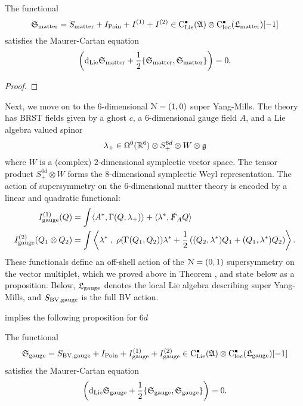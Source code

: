 \documentclass[10pt, oneside]{article}
\begin{document}
\begin{prop}
The functional
\[
\mathfrak S_{\rm matter} = S_{\rm matter} + I_{\rm Poin} + I^{(1)} + I^{(2)} \in {\rm C}_{\rm Lie}^\bullet(\mathfrak{A}) \otimes {\rm C}_{\rm loc}^\bullet(\mathfrak L_{\rm matter}) [-1]
\]
satisfies the Maurer-Cartan equation
\[
\left({\rm d}_{\rm Lie} \mathfrak S_{\rm matter} + \frac{1}{2} \{\mathfrak S_{\rm matter}, \mathfrak S_{\rm matter}\} \right) = 0 .
\]
\end{prop}
\begin{proof}
\end{proof}

Next, we move on to the $6$-dimensional $\mathcal N=(1,0)$ super Yang-Mills. 
The theory has BRST fields given by a ghost $c$, a $6$-dimensional gauge field $A$, and a Lie algebra valued spinor
\[
\lambda_+ \in \Omega^0(\mathbb R^6) \otimes S_+^{6d} \otimes W \otimes \mathfrak g 
\]
where $W$ is a (complex) $2$-dimensional symplectic vector space. 
The tensor product $S_+^{6d} \otimes W$ forms the $8$-dimensional symplectic Weyl representation. 
The action of supersymmetry on the $6$-dimensional matter theory is encoded by a linear and quadratic functional:
\begin{align*}
I_{\rm gauge}^{(1)}(Q) & = \int \langle A^*, \Gamma(Q, \lambda_+)\rangle + \langle\lambda^*, \slashed{F}_A Q\rangle \\
I_{\rm gauge}^{(2)}(Q_1 \otimes Q_2) & = \int \left\langle\lambda^* \;,\; \rho(\Gamma(Q_1,Q_2)) \lambda^* + \frac 12 \left((Q_2, \lambda^*)Q_1 + (Q_1, \lambda^*)Q_2\right)\right\rangle  .
\end{align*}
These functionals define an off-shell action of the $\mathcal N = (0,1)$ supersymmetry on the vector multiplet, which we proved above in Theorem \label{SUSY_YM_theorem}, and state below as a proposition. 
Below, $\mathfrak L_{\rm gauge}$ denotes the local Lie algebra describing super Yang-Mills, and $S_{\rm BV, gauge}$ is the full BV action. 

 implies the following proposition for $6d$
\begin{prop}
The functional
\[
\mathfrak S_{\rm gauge} = S_{\rm BV, gauge} + I_{\rm Poin} + I_{\rm gauge}^{(1)} + I_{\rm gauge}^{(2)} \in {\rm C}_{\rm Lie}^\bullet(\mathfrak{A}) \otimes {\rm C}_{\rm loc}^\bullet(\mathfrak L_{\rm gauge}) [-1]
\]
satisfies the Maurer-Cartan equation
\[
\left({\rm d}_{\rm Lie} \mathfrak S_{\rm gauge} + \frac{1}{2} \{\mathfrak S_{\rm gauge}, \mathfrak S_{\rm gauge}\} \right) = 0 .
\]
\end{prop}
\end{document}
